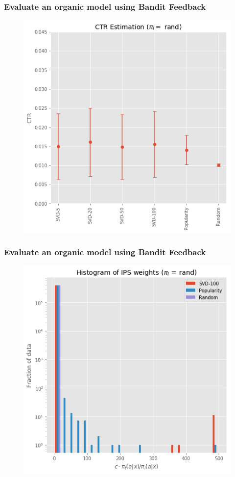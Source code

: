\begin{frame}
  \frametitle{Evaluate an organic model using Bandit Feedback}
\begin{figure}[h!]
\includegraphics[scale=0.4]{images/evalorganicwithbandit3.png}
\centering
\label{motex1}
\end{figure}
\end{frame}

\begin{frame}
  \frametitle{Evaluate an organic model using Bandit Feedback}
\begin{figure}[h!]
\includegraphics[scale=0.4]{images/evalorganicwithbandit4.png}
\centering
\label{motex1}
\end{figure}
\end{frame}


